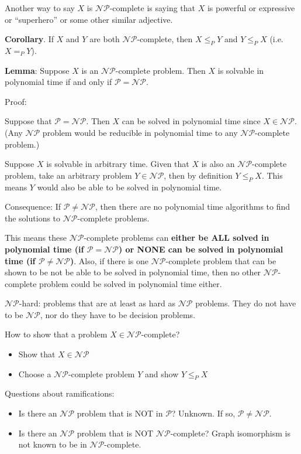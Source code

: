 \documentclass{article}
\begin{document}
Another way to say $X$ is $\mathcal{NP}$-complete is saying that $X$ is powerful or expressive or ``superhero'' or some other similar adjective.

\textbf{Corollary}. If $X$ and $Y$ are both $\mathcal{NP}$-complete, then $X \leq_P Y$ and $Y \leq_P X$ (i.e. $X =_P Y$).

\textbf{Lemma}: Suppose $X$ is an $\mathcal{NP}$-complete problem. Then $X$ is solvable in polynomial time if and only if $\mathcal{P} = \mathcal{NP}$.

Proof:

Suppose that $\mathcal{P} = \mathcal{NP}$. Then $X$ can be solved in polynomial time since $X \in \mathcal{NP}$. (Any $\mathcal{NP}$ problem would be reducible in polynomial time to any $\mathcal{NP}$-complete problem.)

Suppose $X$ is solvable in arbitrary time. Given that $X$ is also an $\mathcal{NP}$-complete problem, take an arbitrary problem $Y \in \mathcal{NP}$, then by definition $Y \leq_P X$. This means $Y$ would also be able to be solved in polynomial time.


Consequence: If $\mathcal{P} \neq \mathcal{NP}$, then there are no polynomial time algorithms to find the solutions to $\mathcal{NP}$-complete problems.

This means these $\mathcal{NP}$-complete problems can \textbf{either be ALL solved in polynomial time (if $\mathcal{P} = \mathcal{NP}$) or NONE can be solved in polynomial time (if $\mathcal{P} \neq \mathcal{NP}$)}. Also, if there is one $\mathcal{NP}$-complete problem that can be shown to be not be able to be solved in polynomial time, then no other $\mathcal{NP}$-complete problem could be solved in polynomial time either.

$\mathcal{NP}$-hard: problems that are at least as hard as $\mathcal{NP}$ problems. They do not have to be $\mathcal{NP}$, nor do they have to be decision problems.

How to show that a problem $X \in \mathcal{NP}$-complete?
\begin{itemize}
    \item Show that $X \in \mathcal{NP}$
    \item Choose a $\mathcal{NP}$-complete problem $Y$ and show $Y \leq_P X$
\end{itemize}

Questions about ramifications:
\begin{itemize}
    \item Is there an $\mathcal{NP}$ problem that is NOT in $\mathcal{P}$? Unknown. If so, $\mathcal{P} \neq \mathcal{NP}$.
    \item Is there an $\mathcal{NP}$ problem that is NOT $\mathcal{NP}$-complete? Graph isomorphism is not known to be in $\mathcal{NP}$-complete.
\end{itemize}
\end{document}
